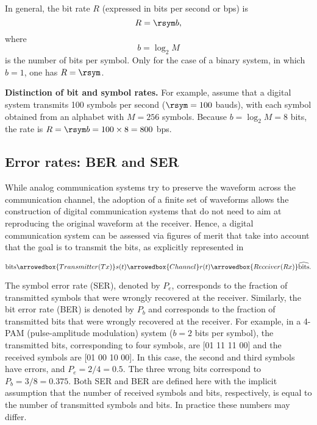 In general, the bit rate $R$ (expressed in bits per second or bps) is 
\[R=\rsym b,\]
where
\[b=\log_2 M\]
is the number of bits per symbol. Only for the case of a binary system, in which $b=1$, one has $R = \rsym$.

\bExample \textbf{Distinction of bit and symbol rates.}
For example, assume that a digital system transmits 100 symbols per second ($\rsym = 100$ bauds), with each symbol obtained from an alphabet with $M=256$ symbols. Because $b= \log_2 M = 8$ bits, the rate is $R=\rsym b = 100 \times 8 = 800$ bps.
\eExample 

\subsection{Error rates: BER and SER}

While analog communication systems try to preserve the waveform across the communication channel, the adoption of a finite set of waveforms allows the construction of digital communication systems that do not need to aim at reproducing the original waveform at the receiver.
Hence, a digital communication system can be assessed via figures of merit that take into account that the goal is to transmit the bits, as explicitly represented in
{\small\[\textrm{bits} \arrowedbox{Transmitter (Tx)} s(t) \arrowedbox{Channel} r(t)  \arrowedbox{Receiver (Rx)}  \widehat{\textrm{bits}}.\]\par}

The symbol error rate (SER), denoted by $P_e$, corresponds to the fraction of transmitted symbols that were wrongly recovered at the receiver. Similarly, the bit error rate (BER) is denoted by $P_b$ and corresponds to the fraction of transmitted bits that were wrongly recovered at the receiver. 
For example, in a 4-PAM (pulse-amplitude modulation) system ($b=2$ bits per symbol), the transmitted bits, corresponding to four symbols, are [01 11 11 00] and the received symbols are [01 00 10 00]. In this case, the second and third symbols have errors, and $P_e = 2/4 = 0.5$. The three wrong bits correspond to $P_b = 3/8 = 0.375$. Both SER and BER are defined here with the implicit assumption that the number of received symbols and bits, respectively, is equal to the number of transmitted symbols and bits. In practice
these numbers may differ.

